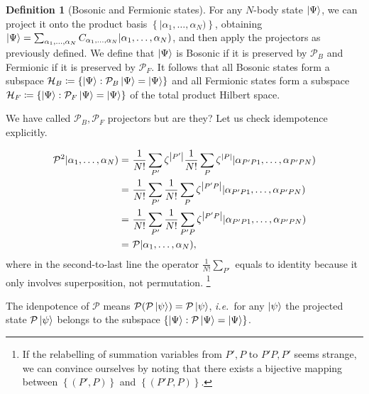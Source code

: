\documentclass{article}
\theoremstyle{definition}
\newtheorem{dfn}[mot]{Definition}
\numberwithin{equation}{section}
\begin{document}
\begin{dfn}[Bosonic and Fermionic states]
    \label{dfn:bosonic-and-fermionic-states}
    For any $N$-body state $\ket{\Psi}$, we can project it 
    onto the product basis 
    $\left\{ |\alpha_1, \ldots ,\alpha_{N}) \right\}$, 
    obtaining 
    $\ket{\Psi}=\sum_{\alpha_1, \ldots ,\alpha_{N}} 
    C_{\alpha_1, \ldots ,\alpha_{N}}
    |\alpha_1, \ldots ,\alpha_{N})$, 
    and then apply the projectors as previously defined. 
    We define that $\ket{\Psi}$ is Bosonic if it is preserved by $\mathcal{P}_{B}$ 
    and Fermionic if it is preserved by $\mathcal{P}_{F}$. 
    It follows that all Bosonic states form a subspace 
    $\mathcal{H}_{B}\coloneqq \left\{ \ket{\Psi} : \mathcal{P}_{B} \ket{\Psi}=\ket{\Psi} \right\}$
    and all Fermionic states form a subspace 
    $\mathcal{H}_{F}\coloneqq \left\{ \ket{\Psi} : \mathcal{P}_{F} \ket{\Psi}=\ket{\Psi} \right\}$ of the total product Hilbert space.
\end{dfn}

We have called $\mathcal{P}_{B}, \mathcal{P}_{F}$ projectors but are they? 
Let us check idempotence explicitly.

\begin{align*}
    \mathcal{P}^{2}|\alpha_{1}, \ldots ,\alpha_{N})
    =&\ 
    \frac{1}{N!}\sum_{P'}\zeta^{\abs{P'}}
    \frac{1}{N!}\sum_{P}\zeta^{\abs{P}}
    |\alpha_{P'P1}, \ldots ,\alpha_{P'PN})
    \\
    =&\ 
    \frac{1}{N!}\sum_{P'}
    \frac{1}{N!}\sum_{P}\zeta^{\abs{P'P}}
    |\alpha_{P'P1}, \ldots ,\alpha_{P'PN})
    \\
    =&\ 
    \frac{1}{N!}\sum_{P'}
    \frac{1}{N!}\sum_{P'P}
    \zeta^\abs{P'P}
    |\alpha_{P'P1}, \ldots ,\alpha_{P'PN})
    \\
    =&\ 
    \mathcal{P} |\alpha_1, \ldots ,\alpha_{N}),
\end{align*}
where in the second-to-last line the operator $\frac{1}{N!}\sum_{P'}$ 
equals to identity because it only involves superposition, not 
permutation. 
\footnote{If the relabelling of summation variables from $P',P$ to 
$P'P, P'$ seems strange, we can convince ourselves by noting that there 
exists a bijective mapping between $\left\{ (P',P) \right\}$ and 
$\left\{ (P'P, P) \right\}$. }

    The idenpotence of $\mathcal{P}$ means 
    $\mathcal{P} (\mathcal{P} \ket{\psi}) = \mathcal{P} \ket{\psi}$, \textit{i.e.}~for 
    any $\ket{\psi}$ the projected state $\mathcal{P} \ket{\psi}$ 
    belongs to the subspace $\{\ket{\Psi} : \mathcal{P} \ket{\Psi} = \ket{\Psi}\}$. 
\end{document}
